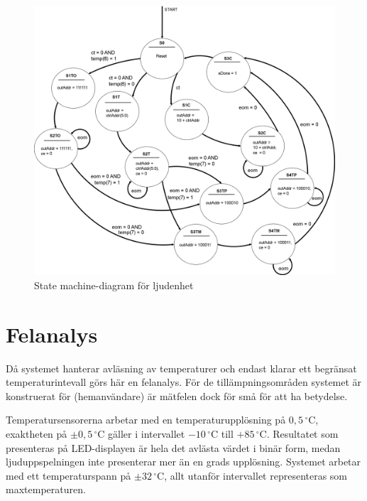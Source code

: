 \documentclass[a4paper,11pt]{article}
\begin{document}
	\begin{figure}[H]
	  \centering
	      \includegraphics[scale=0.18, angle=0]{SoundStateMachineDiagram.png}
	  	\caption{State machine-diagram för ljudenhet}
		\label{fig:SoundSM}
	\end{figure}

\pagebreak

\section{Felanalys}

Då systemet hanterar avläsning av temperaturer och endast klarar ett begränsat temperaturintevall
görs här en felanalys. För de tillämpningsområden systemet är konstruerat för (hemanvändare) 
är mätfelen dock för små för att ha betydelse.

Temperatursensorerna arbetar med en temperaturupplösning på $0,5\,^{\circ}\mathrm{C}$, exaktheten på $\pm 0,5\,^{\circ}\mathrm{C}$ gäller i intervallet $-10\,^{\circ}\mathrm{C}$ till $+85\,^{\circ}\mathrm{C}$. Resultatet som presenteras på LED-displayen är hela det avlästa värdet i binär form, medan ljuduppspelningen inte presenterar mer än en grads upplösning.
Systemet arbetar med ett temperaturspann på $\pm 32\,^{\circ}\mathrm{C}$, allt utanför intervallet representeras som maxtemperaturen.

\pagebreak

	\appendix
	\renewcommand{\appendixpagename}{Appendix}
	\appendixpage
	\renewcommand{\appendixtocname}{Appendix}
\end{document}
